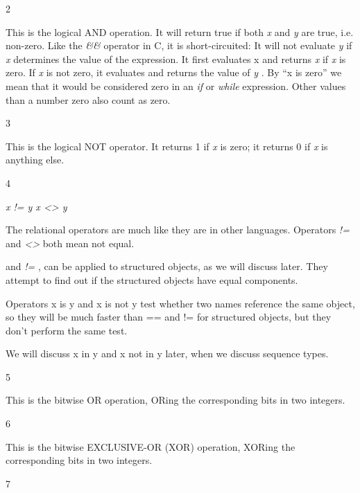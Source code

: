 2



This is the logical AND operation.
It will return true if both \emph{x} and \emph{y} are true, i.e.
non-zero. Like the \emph{\&\&} operator in C, it is short-circuited: It
will not evaluate \emph{y} if \emph{x} determines the value of the
expression. It first evaluates x and returns \emph{x} if \emph{x} is
zero. If \emph{x} is not zero, it evaluates and returns the value of
\emph{y} . By ``x is zero'' we mean that it would be considered zero in
an \emph{if} or \emph{while} expression. Other values than a number zero
also count as zero.

3



This is the logical NOT operator.
It returns 1 if \emph{x} is zero; it returns 0 if \emph{x} is anything
else.

4











 \emph{x != y x
\textless{}\textgreater{} y}









The relational operators are much
like they are in other languages. Operators \emph{!=} and
\emph{\textless{}\textgreater{}} both mean not equal.


and \emph{!=} , can be applied to structured objects, as we will discuss
later. They attempt to find out if the structured objects have equal
components.

Operators x is y and x is not y
test whether two names reference the same object, so they will be much
faster than == and != for structured objects, but they don't perform the
same test.

We will discuss x in y and x not
in y later, when we discuss sequence types.

5



This is the bitwise OR operation,
ORing the corresponding bits in two integers.

6



This is the bitwise EXCLUSIVE-OR
(XOR) operation, XORing the corresponding bits in two integers.

7



